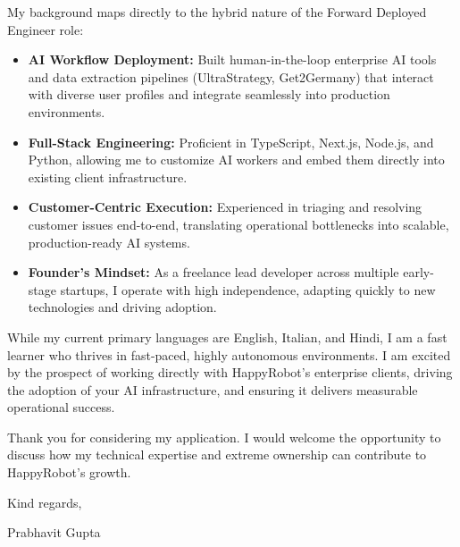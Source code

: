 \documentclass[a4paper,11pt]{article}
\begin{document}
My background maps directly to the hybrid nature of the Forward Deployed Engineer role:
\begin{itemize}
    \item \textbf{AI Workflow Deployment:} Built human-in-the-loop enterprise AI tools and data extraction pipelines (UltraStrategy, Get2Germany) that interact with diverse user profiles and integrate seamlessly into production environments.
    \item \textbf{Full-Stack Engineering:} Proficient in TypeScript, Next.js, Node.js, and Python, allowing me to customize AI workers and embed them directly into existing client infrastructure.
    \item \textbf{Customer-Centric Execution:} Experienced in triaging and resolving customer issues end-to-end, translating operational bottlenecks into scalable, production-ready AI systems.
    \item \textbf{Founder's Mindset:} As a freelance lead developer across multiple early-stage startups, I operate with high independence, adapting quickly to new technologies and driving adoption.
\end{itemize}

While my current primary languages are English, Italian, and Hindi, I am a fast learner who thrives in fast-paced, highly autonomous environments. I am excited by the prospect of working directly with HappyRobot's enterprise clients, driving the adoption of your AI infrastructure, and ensuring it delivers measurable operational success.

Thank you for considering my application. I would welcome the opportunity to discuss how my technical expertise and extreme ownership can contribute to HappyRobot's growth.

\vspace{1em}

Kind regards,

\vspace{1em}

Prabhavit Gupta
\end{document}
